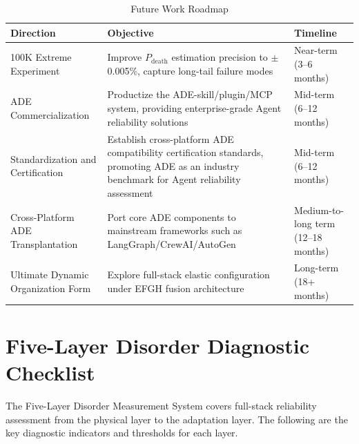 \documentclass[11pt,a4paper]{article}
\begin{document}
\begin{table}[htbp]
\centering
\caption{Future Work Roadmap}
\label{tab:future-work}
\begin{tabular}{p{}p{}p{}}
\hline
\textbf{Direction} & \textbf{Objective} & \textbf{Timeline} \\
\hline
100K Extreme Experiment & Improve $P_{\text{death}}$ estimation precision to $\pm$0.005\%, capture long-tail failure modes & Near-term (3--6 months) \\
ADE Commercialization & Productize the ADE-skill/plugin/MCP system, providing enterprise-grade Agent reliability solutions & Mid-term (6--12 months) \\
Standardization and Certification & Establish cross-platform ADE compatibility certification standards, promoting ADE as an industry benchmark for Agent reliability assessment & Mid-term (6--12 months) \\
Cross-Platform ADE Transplantation & Port core ADE components to mainstream frameworks such as LangGraph/CrewAI/AutoGen & Medium-to-long term (12--18 months) \\
Ultimate Dynamic Organization Form & Explore full-stack elastic configuration under EFGH fusion architecture & Long-term (18+ months) \\
\hline
\end{tabular}
\end{table}


\appendix

\section{Five-Layer Disorder Diagnostic Checklist}
\label{app:B}

The Five-Layer Disorder Measurement System covers full-stack reliability assessment from the physical layer to the adaptation layer. The following are the key diagnostic indicators and thresholds for each layer.
\end{document}
